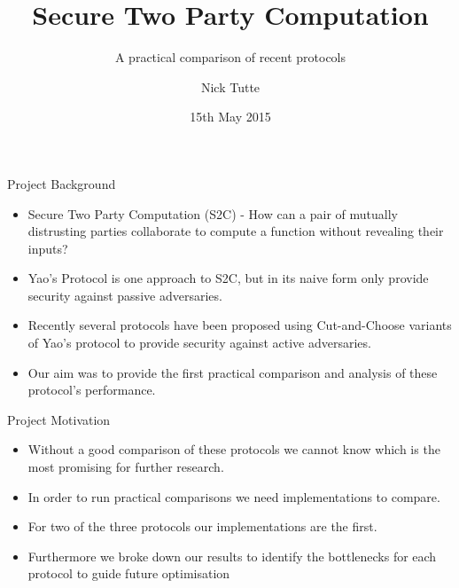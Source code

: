 \documentclass[t, 12pt]{beamer}            %
\title[Secure Two Party Computation]{Secure Two Party Computation}
\subtitle{A practical comparison of recent protocols}
\author{Nick Tutte}
\institute{University of Bristol}
\date{15th May 2015}
\begin{document}
\titlepage


\begin{frame}{Project Background}
	\begin{itemize} %
		\item Secure Two Party Computation (S2C) - How can a pair of mutually distrusting parties collaborate to compute a function without revealing their inputs?
		\item Yao's Protocol is one approach to S2C, but in its naive form only provide security against passive adversaries.
		\item Recently several protocols have been proposed using Cut-and-Choose variants of Yao's protocol to provide security against active adversaries.
		\item Our aim was to provide the first practical comparison and analysis of these protocol's performance.
	\end{itemize}
\end{frame}


\begin{frame}{Project Motivation}
	\begin{itemize} %
		\item Without a good comparison of these protocols we cannot know which is the most promising for further research.
		\item In order to run practical comparisons we need implementations to compare.
		\item For two of the three protocols our implementations are the first.
		\item Furthermore we broke down our results to identify the bottlenecks for each protocol to guide future optimisation
	\end{itemize}
\end{frame}


\end{document}

